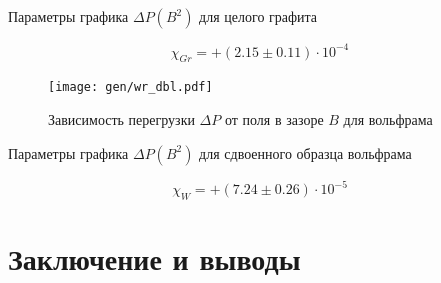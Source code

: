 \documentclass[12pt,a4paper]{article}
\begin{document}
	\begin{table}[h]
		\caption{Параметры графика $\Delta P(B^2)$ для целого графита}
		
	\end{table}
	
	$$\chi_{Gr} = +(2.15 \pm 0.11) \cdot 10^{-4} $$
	
	\begin{figure}[H]
		\texttt{[image: gen/wr\_dbl.pdf]}
		\caption{Зависимость перегрузки $\Delta P$ от поля в зазоре $B$ для вольфрама}
	\end{figure}
	
	\begin{table}[h]
		\caption{Параметры графика $\Delta P(B^2)$ для сдвоенного образца вольфрама}
		
	\end{table}
	
	$$\chi_{W} = +(7.24 \pm 0.26) \cdot 10^{-5} $$
	
	
	\section*{Заключение и выводы}
	
	
\end{document}
